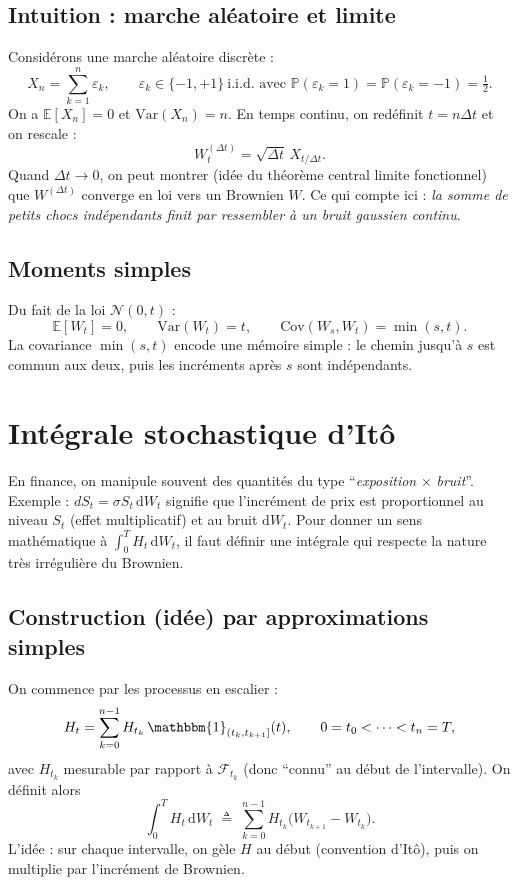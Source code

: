 \documentclass[11pt,a4paper]{report}
\newcommand{\dd}{\mathrm{d}}
\newcommand{\E}{\mathbb{E}}
\newcommand{\Var}{\mathrm{Var}}
\newcommand{\Cov}{\mathrm{Cov}}
\newcommand{\Prob}{\mathbb{P}}
\newcommand{\1}{\mathbbm{1}}
\newcommand{\Normal}{\mathcal{N}}
\newcommand{\F}{\mathcal{F}}
\theoremstyle{definition}
\theoremstyle{plain}
\theoremstyle{remark}
\begin{document}
\subsection{Intuition : marche aléatoire et limite}
Considérons une marche aléatoire discrète :
\[
X_n=\sum_{k=1}^n \varepsilon_k,
\qquad \varepsilon_k \in \{-1,+1\}\ \text{i.i.d. avec } \Prob(\varepsilon_k=1)=\Prob(\varepsilon_k=-1)=\tfrac12.
\]
On a $\E[X_n]=0$ et $\Var(X_n)=n$.
En temps continu, on redéfinit $t=n\Delta t$ et on rescale :
\[
W_t^{(\Delta t)}=\sqrt{\Delta t}\,X_{t/\Delta t}.
\]
Quand $\Delta t\to 0$, on peut montrer (idée du théorème central limite fonctionnel) que $W^{(\Delta t)}$ converge en loi vers un Brownien $W$.
Ce qui compte ici : \emph{la somme de petits chocs indépendants finit par ressembler à un bruit gaussien continu}.

\subsection{Moments simples}
Du fait de la loi $\Normal(0,t)$ :
\[
\E[W_t]=0,\qquad \Var(W_t)=t,\qquad \Cov(W_s,W_t)=\min(s,t).
\]
La covariance $\min(s,t)$ encode une mémoire simple : le chemin jusqu'à $s$ est commun aux deux, puis les incréments après $s$ sont indépendants.

\section{Intégrale stochastique d'Itô}
\label{sec:ito_integrale}

En finance, on manipule souvent des quantités du type ``\emph{exposition} $\times$ \emph{bruit}''.
Exemple : $dS_t = \sigma S_t\,\dd W_t$ signifie que l'incrément de prix est proportionnel au niveau $S_t$ (effet multiplicatif) et au bruit $\dd W_t$.
Pour donner un sens mathématique à $\int_0^T H_t\,\dd W_t$, il faut définir une intégrale qui respecte la nature très irrégulière du Brownien.

\subsection{Construction (idée) par approximations simples}
On commence par les processus en escalier :
\[
H_t = \sum_{k=0}^{n-1} H_{t_k}\,\1_{(t_k,t_{k+1}]}(t),
\qquad 0=t_0<\dots<t_n=T,
\]
avec $H_{t_k}$ mesurable par rapport à $\F_{t_k}$ (donc ``connu'' au début de l'intervalle).
On définit alors
\[
\int_0^T H_t\,\dd W_t \;\triangleq\; \sum_{k=0}^{n-1} H_{t_k}\bigl(W_{t_{k+1}}-W_{t_k}\bigr).
\]
L'idée : sur chaque intervalle, on gèle $H$ au début (convention d'Itô), puis on multiplie par l'incrément de Brownien.
\end{document}
